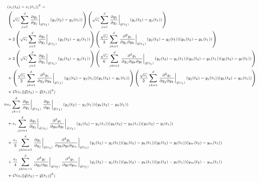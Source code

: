 \documentclass[12pt]{article}
\begin{document}
\begin{equation}
\scriptsize
\begin{aligned}
& (z_i(t_2) - z_i(t_1))^2 = \\ 
& \left( \sqrt{e_i} \sum_{j=1}^d \left. \frac{\partial g_i}{\partial y_j} \right|_{\vec{y}(t_1)} (y_j(t_2)-y_j(t_1)) \right) \left( \sqrt{e_i} \sum_{j=1}^d \left. \frac{\partial g_i}{\partial y_j} \right|_{\vec{y}(t_1)} (y_j(t_2)-y_j(t_1)) \right) \\
&+ 2 \left( \sqrt{e_i} \sum_{j=1}^d \left. \frac{\partial g_i}{\partial y_j} \right|_{\vec{y}(t_1)} (y_j(t_2)-y_j(t_1)) \right) \left( \frac{\sqrt{e_i}}{2} \sum_{jk=1}^d \left. \frac{\partial^2 g_i}{\partial y_j \partial y_k} \right|_{\vec{y}(t_1)} (y_j(t_2)-y_j(t_1)) (y_k(t_2)-y_k(t_1)) \right) \\
&+ 2 \left( \sqrt{e_i} \sum_{j=1}^d \left. \frac{\partial g_i}{\partial y_j} \right|_{\vec{y}(t_1)} (y_j(t_2)-y_j(t_1)) \right) \left( \frac{\sqrt{e_i}}{6} \sum_{jkl=1}^d \left. \frac{\partial^3 g_i}{\partial y_j \partial y_k \partial y_l} \right|_{\vec{y}(t_1)} (y_j(t_2)-y_j(t_1)) (y_k(t_2)-y_k(t_1)) (y_l(t_2)-y_l(t_1)) \right) \\
&+ \left( \frac{\sqrt{e_i}}{2} \sum_{jk=1}^d \left. \frac{\partial^2 g_i}{\partial y_j \partial y_k} \right|_{\vec{y}(t_1)} (y_j(t_2)-y_j(t_1)) (y_k(t_2)-y_k(t_1)) \right) \left( \frac{\sqrt{e_i}}{2} \sum_{jk=1}^d \left. \frac{\partial^2 g_i}{\partial y_j \partial y_k} \right|_{\vec{y}(t_1)} (y_j(t_2)-y_j(t_1)) (y_k(t_2)-y_k(t_1)) \right) \\
&+ \mathcal{O}( e_i \|\vec{y}(t_2) - \vec{y}(t_1) \|^5) \\
=& e_i \sum_{jk=1}^d \left. \frac{\partial g_i}{\partial y_j} \right|_{\vec{y}(t_1)} \left. \frac{\partial g_i}{\partial y_k} \right|_{\vec{y}(t_1)} (y_j(t_2)-y_j(t_1)) (y_k(t_2)-y_k(t_1)) \\
&+ e_i \sum_{jkl=1}^d \left. \frac{\partial g_i}{\partial y_j} \right|_{\vec{y}(t_1)} \left. \frac{\partial^2 g_i}{\partial y_k \partial y_l} \right|_{\vec{y}(t_1)} (y_j(t_2)-y_j(t_1))  (y_k(t_2)-y_k(t_1)) (y_l(t_2)-y_l(t_1)) \\
&+ \frac{e_i}{3} \sum_{jklm=1}^d \left. \frac{\partial g_i}{\partial y_j} \right|_{\vec{y}(t_1)} \left. \frac{\partial^3 g_i}{ \partial y_k \partial y_l \partial y_m} \right|_{\vec{y}(t_1)} (y_j(t_2)-y_j(t_1)) (y_k(t_2)-y_k(t_1)) (y_l(t_2)-y_l(t_1))(y_m(t_2)-y_m(t_1)) \\
&+ \frac{e_i}{4} \sum_{jklm=1}^d \left. \frac{\partial^2 g_i}{\partial y_j \partial y_k} \right|_{\vec{y}(t_1)} \left. \frac{\partial^2 g_i}{\partial y_l \partial y_m} \right|_{\vec{y}(t_1)} (y_j(t_2)-y_j(t_1)) (y_k(t_2)-y_k(t_1)) (y_l(t_2)-y_l(t_1)) (y_m(t_2)-y_m(t_1)) \\
&+ \mathcal{O}(e_i \|\vec{y}(t_2) - \vec{y}(t_1) \|^5)
\end{aligned}
\end{equation}
\end{document}
